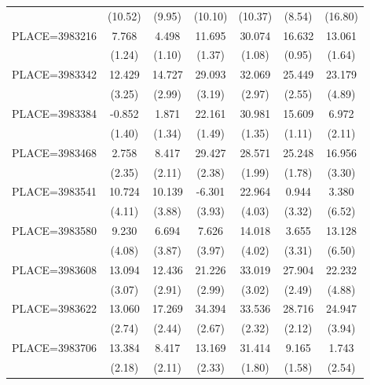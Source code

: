 {\begin{tabular}{l*{6}{c}}
                    &     (10.52)&      (9.95)&     (10.10)&     (10.37)&      (8.54)&     (16.80)\\
PLACE=3983216       &       7.768&       4.498&      11.695&      30.074&      16.632&      13.061\\
                    &      (1.24)&      (1.10)&      (1.37)&      (1.08)&      (0.95)&      (1.64)\\
PLACE=3983342       &      12.429&      14.727&      29.093&      32.069&      25.449&      23.179\\
                    &      (3.25)&      (2.99)&      (3.19)&      (2.97)&      (2.55)&      (4.89)\\
PLACE=3983384       &      -0.852&       1.871&      22.161&      30.981&      15.609&       6.972\\
                    &      (1.40)&      (1.34)&      (1.49)&      (1.35)&      (1.11)&      (2.11)\\
PLACE=3983468       &       2.758&       8.417&      29.427&      28.571&      25.248&      16.956\\
                    &      (2.35)&      (2.11)&      (2.38)&      (1.99)&      (1.78)&      (3.30)\\
PLACE=3983541       &      10.724&      10.139&      -6.301&      22.964&       0.944&       3.380\\
                    &      (4.11)&      (3.88)&      (3.93)&      (4.03)&      (3.32)&      (6.52)\\
PLACE=3983580       &       9.230&       6.694&       7.626&      14.018&       3.655&      13.128\\
                    &      (4.08)&      (3.87)&      (3.97)&      (4.02)&      (3.31)&      (6.50)\\
PLACE=3983608       &      13.094&      12.436&      21.226&      33.019&      27.904&      22.232\\
                    &      (3.07)&      (2.91)&      (2.99)&      (3.02)&      (2.49)&      (4.88)\\
PLACE=3983622       &      13.060&      17.269&      34.394&      33.536&      28.716&      24.947\\
                    &      (2.74)&      (2.44)&      (2.67)&      (2.32)&      (2.12)&      (3.94)\\
PLACE=3983706       &      13.384&       8.417&      13.169&      31.414&       9.165&       1.743\\
                    &      (2.18)&      (2.11)&      (2.33)&      (1.80)&      (1.58)&      (2.54)\\

\end{tabular}}
